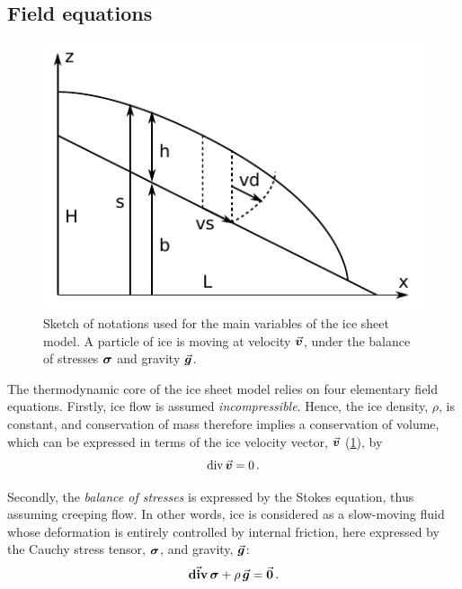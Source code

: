 \documentclass{article}
\newcommand{\vect}[1]{\va*{#1}} %
\newcommand{\tens}[1]{\vb*{#1}} %
\renewcommand{\div}[1]{\mathrm{div}\,#1}            %
\newcommand{\tdiv}[1]{\vect{\mathrm{div}}\,#1}      %
\newcommand{\CST}[0]{\tens{\sigma}}     %
\newcommand{\vv}[0]{\vect{v}}           %
\begin{document}
\subsection{Field equations}

\begin{figure}
  \centering
  \includegraphics{model-variables}
  \caption{Sketch of notations used for the main variables of the ice sheet
           model. A particle of ice is moving at velocity $\vv$, under the
           balance of stresses $\CST$ and gravity $\vect{g}$.}
  \label{fig:model-variables}
\end{figure}

The thermodynamic core of the ice sheet model relies on four elementary field
equations. Firstly, ice flow is assumed \emph{incompressible}. Hence, the ice
density, $\rho$, is constant, and
conservation of mass therefore implies a conservation of volume, which can be expressed
in terms of the ice velocity vector, $\vv$ (\cref{fig:model-variables}), by
\begin{equation}
    \label{eqn:incompressibility}
    \div{\vv} = 0 \,.
\end{equation}

Secondly, the \emph{balance of stresses} is expressed by the Stokes equation,
thus assuming creeping flow. In other words, ice is considered as a slow-moving
fluid whose deformation is entirely controlled by internal friction, here
expressed by the Cauchy stress tensor, $\CST$, and gravity, $\vect{g}$:
\begin{equation}
    \label{eqn:stressbalance}
    \tdiv{\CST} + \rho\,\vect{g} = \vect{0} \,.
\end{equation}
\end{document}
